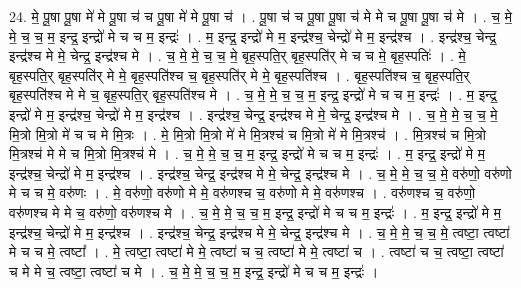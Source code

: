 \documentclass[17pt]{extarticle}
\begin{document}
24. मे॒ पू॒षा पू॒षा मे॑ मे पू॒षा च॑ च पू॒षा मे॑ मे पू॒षा च॑ । . पू॒षा च॑ च पू॒षा पू॒षा च॑ मे मे च पू॒षा पू॒षा च॑ मे । . च॒ मे॒ मे॒ च॒ च॒ म॒ इन्द्र॒ इन्द्रो॑ मे च च म॒ इन्द्रः॑ । . म॒ इन्द्र॒ इन्द्रो॑ मे म॒ इन्द्र॑श्च॒ चेन्द्रो॑ मे म॒ इन्द्र॑श्च । . इन्द्र॑श्च॒ चेन्द्र॒ इन्द्र॑श्च मे मे॒ चेन्द्र॒ इन्द्र॑श्च मे । . च॒ मे॒ मे॒ च॒ च॒ मे॒ बृह॒स्पति॒र् बृह॒स्पति॑र् मे च च मे॒ बृह॒स्पतिः॑ । . मे॒ बृह॒स्पति॒र् बृह॒स्पति॑र् मे मे॒ बृह॒स्पति॑श्च च॒ बृह॒स्पति॑र् मे मे॒ बृह॒स्पति॑श्च । . बृह॒स्पति॑श्च च॒ बृह॒स्पति॒र् बृह॒स्पति॑श्च मे मे च॒ बृह॒स्पति॒र् बृह॒स्पति॑श्च मे । . च॒ मे॒ मे॒ च॒ च॒ म॒ इन्द्र॒ इन्द्रो॑ मे च च म॒ इन्द्रः॑ । . म॒ इन्द्र॒ इन्द्रो॑ मे म॒ इन्द्र॑श्च॒ चेन्द्रो॑ मे म॒ इन्द्र॑श्च । . इन्द्र॑श्च॒ चेन्द्र॒ इन्द्र॑श्च मे मे॒ चेन्द्र॒ इन्द्र॑श्च मे । . च॒ मे॒ मे॒ च॒ च॒ मे॒ मि॒त्रो मि॒त्रो मे॑ च च मे मि॒त्रः । . मे॒ मि॒त्रो मि॒त्रो मे॑ मे मि॒त्रश्च॑ च मि॒त्रो मे॑ मे मि॒त्रश्च॑ । . मि॒त्रश्च॑ च मि॒त्रो मि॒त्रश्च॑ मे मे च मि॒त्रो मि॒त्रश्च॑ मे । . च॒ मे॒ मे॒ च॒ च॒ म॒ इन्द्र॒ इन्द्रो॑ मे च च म॒ इन्द्रः॑ । . म॒ इन्द्र॒ इन्द्रो॑ मे म॒ इन्द्र॑श्च॒ चेन्द्रो॑ मे म॒ इन्द्र॑श्च । . इन्द्र॑श्च॒ चेन्द्र॒ इन्द्र॑श्च मे मे॒ चेन्द्र॒ इन्द्र॑श्च मे । . च॒ मे॒ मे॒ च॒ च॒ मे॒ वरु॑णो॒ वरु॑णो मे च च मे॒ वरु॑णः । . मे॒ वरु॑णो॒ वरु॑णो मे मे॒ वरु॑णश्च च॒ वरु॑णो मे मे॒ वरु॑णश्च । . वरु॑णश्च च॒ वरु॑णो॒ वरु॑णश्च मे मे च॒ वरु॑णो॒ वरु॑णश्च मे । . च॒ मे॒ मे॒ च॒ च॒ म॒ इन्द्र॒ इन्द्रो॑ मे च च म॒ इन्द्रः॑ । . म॒ इन्द्र॒ इन्द्रो॑ मे म॒ इन्द्र॑श्च॒ चेन्द्रो॑ मे म॒ इन्द्र॑श्च । . इन्द्र॑श्च॒ चेन्द्र॒ इन्द्र॑श्च मे मे॒ चेन्द्र॒ इन्द्र॑श्च मे । . च॒ मे॒ मे॒ च॒ च॒ मे॒ त्वष्टा॒ त्वष्टा॑ मे च च मे॒ त्वष्टा᳚ । . मे॒ त्वष्टा॒ त्वष्टा॑ मे मे॒ त्वष्टा॑ च च॒ त्वष्टा॑ मे मे॒ त्वष्टा॑ च । . त्वष्टा॑ च च॒ त्वष्टा॒ त्वष्टा॑ च मे मे च॒ त्वष्टा॒ त्वष्टा॑ च मे । . च॒ मे॒ मे॒ च॒ च॒ म॒ इन्द्र॒ इन्द्रो॑ मे च च म॒ इन्द्रः॑ । \newline
\pagebreak
{}
\end{document}
